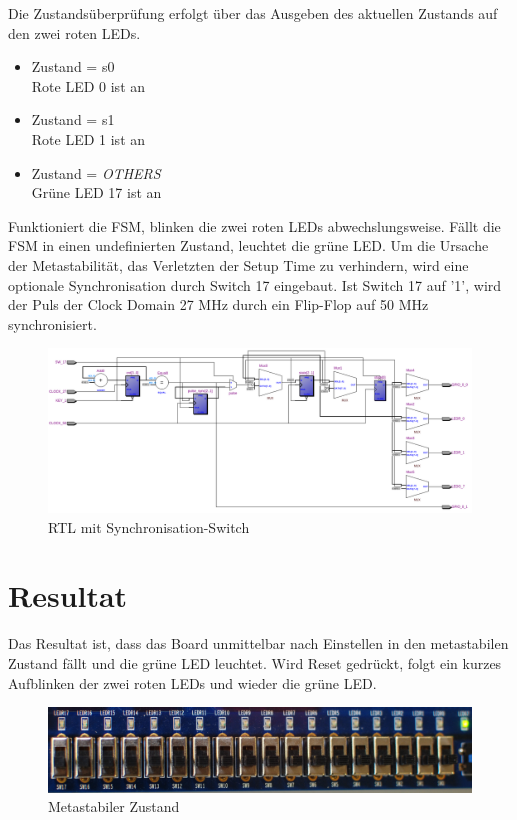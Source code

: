 Die Zustandsüberprüfung erfolgt über das Ausgeben des aktuellen Zustands auf den zwei roten LEDs. 

\begin{itemize}
	\item Zustand = s0\\
	Rote LED 0 ist an
	\item Zustand = s1\\
	 Rote LED 1 ist an
	\item Zustand = \textit{OTHERS}\\
	 Grüne LED 17 ist an
\end{itemize}

Funktioniert die FSM, blinken die zwei roten LEDs abwechslungsweise. Fällt die FSM in einen undefinierten Zustand, leuchtet die grüne LED. Um die Ursache der Metastabilität, das Verletzten der Setup Time zu verhindern, wird eine optionale Synchronisation durch Switch 17 eingebaut. Ist Switch 17  auf '1', wird der Puls der Clock Domain 27 MHz durch ein Flip-Flop auf 50 MHz synchronisiert.

\begin{figure}[H]
	\includegraphics[width=1\textwidth]{images/metastability/RtL_metastaibility.png}
	\caption{RTL mit Synchronisation-Switch}
	\label{fig.metastabil.RtL}
\end{figure}

\newpage
\section{Resultat}\label{sect.meatastabil_proozieren}

Das Resultat ist, dass das Board unmittelbar nach Einstellen in den metastabilen Zustand fällt und die grüne LED leuchtet. Wird Reset gedrückt, folgt ein kurzes Aufblinken der zwei roten LEDs und wieder die grüne LED.

\begin{figure}[H]
	\includegraphics[width=1\textwidth]{images/metastability/metastabil.JPG}
	\caption{Metastabiler Zustand}
	\label{fig.metastabil.Ergebnis_Boardasynchron}
\end{figure}

